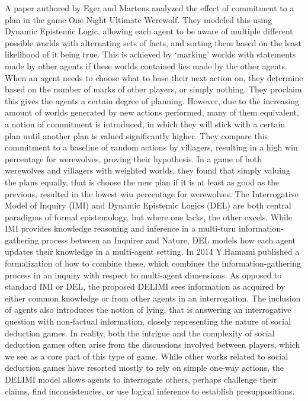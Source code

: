 A paper authored by Eger and Martens\cite{commitment} analyzed the effect of 
commitment to a plan in the game One Night Ultimate Werewolf. They modeled this 
using Dynamic Epistemic Logic, allowing each agent to be aware of multiple 
different possible worlds with alternating sets of facts, and sorting them 
based on the least likelihood of it being true. This is achieved by ‘marking’ 
worlds with statements made by other agents if these worlds contained lies made 
by the other agents. When an agent needs to choose what to base their next 
action on, they determine based on the number of marks of other players, or 
simply nothing. They proclaim this gives the agents a certain degree of 
planning. However, due to the increasing amount of worlds generated by new 
actions performed, many of them equivalent, a notion of commitment is 
introduced, in which they will stick with a certain plan until another plan is 
valued significantly higher. They compare this commitment to a baseline of 
random actions by villagers, resulting in a high win percentage for werewolves, 
proving their hypothesis. In a game of both werewolves and villagers with 
weighted worlds, they found that simply valuing the plans equally, that is 
choose the new plan if it is at least as good as the previous, resulted in the 
lowest win percentage for werewolves. The Interrogative Model of Inquiry (IMI) 
and Dynamic Epistemic Logics (DEL) are both central paradigms of formal 
epistemology, but where one lacks, the other excels. While IMI provides 
knowledge reasoning and inference in a multi-turn information-gathering process 
between an Inquirer and Nature, DEL models how each agent updates their 
knowledge in a multi-agent setting. In 2014 Y.Hamami\cite{delimi} published a 
formalization of how to combine these, which combines the information-gathering 
process in an inquiry with respect to multi-agent dimensions. As opposed to 
standard IMI or DEL, the proposed DELIMI sees information as acquired by either 
common knowledge or from other agents in an interrogation. The inclusion of 
agents also introduces the notion of lying, that is answering an interrogative 
question with non-factual information, closely representing the nature of 
social deduction games. In reality, both the intrigue and the complexity of 
social deduction games often arise from the discussions involved between 
players, which we see as a core part of this type of game. While other works 
related to social deduction games have resorted mostly to rely on simple 
one-way actions, the DELIMI model allows agents to interrogate others, perhaps 
challenge their claims, find inconsistencies, or use logical inference to 
establish presuppositions.


